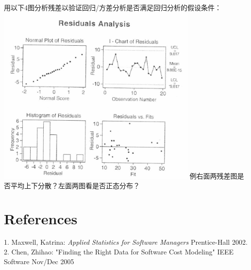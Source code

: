 用以下4图分析残差以验证回归/方差分析是否满足回归分析的假设条件：\\

\includegraphics[width=10cm]{相关性15.png}
例右面两残差图是否平均上下分散？左面两图看是否正态分布？

\hypertarget{references}{%
\section{References}\label{references}}

1. Maxwell, Katrina: \emph{Applied Statistics for Software Managers}
Prentice-Hall 2002.\\
2. Chen, Zhihao: "Finding the Right Data for Software Cost Modeling"
IEEE Software Nov/Dec 2005




